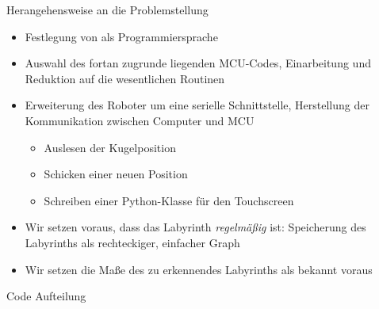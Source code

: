 \documentclass{beamer}
\begin{document}
\begin{frame}[fragile,t]{Herangehensweise an die Problemstellung}
\begin{itemize}[<+->]
\item Festlegung von  als Programmiersprache
\item Auswahl des fortan zugrunde liegenden MCU-Codes, Einarbeitung und Reduktion auf die wesentlichen Routinen
\item Erweiterung des Roboter um eine serielle Schnittstelle, Herstellung der Kommunikation zwischen Computer und MCU
\begin{itemize}
\item Auslesen der Kugelposition
\item Schicken einer neuen Position
\item Schreiben einer Python-Klasse für den Touchscreen
\end{itemize}
\item Wir setzen voraus, dass das Labyrinth \textit{regelmäßig} ist: Speicherung des Labyrinths als rechteckiger, einfacher Graph
\item Wir setzen die Maße des zu erkennendes Labyrinths als bekannt voraus
\end{itemize}
\end{frame}

\begin{frame}[fragile,t]{Code Aufteilung}
\vfill
\begin{figure}[h]
  \centering
\end{figure}
\end{frame}
\end{document}
